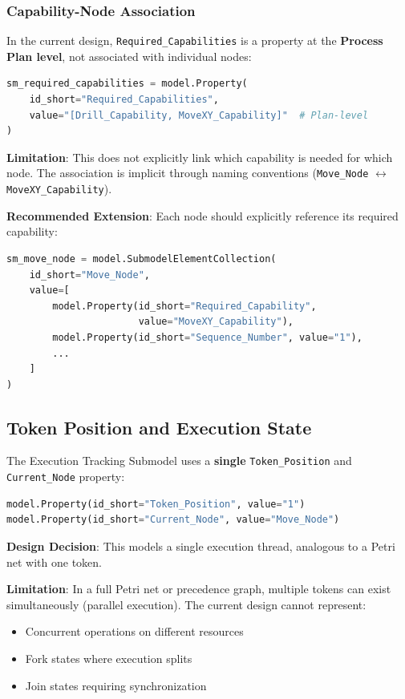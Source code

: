 \subsubsection{Capability-Node Association}

In the current design, \texttt{Required\_Capabilities} is a property at the \textbf{Process Plan level}, not associated with individual nodes:

\begin{lstlisting}[language=Python]
sm_required_capabilities = model.Property(
    id_short="Required_Capabilities",
    value="[Drill_Capability, MoveXY_Capability]"  # Plan-level
)
\end{lstlisting}

\textbf{Limitation}: This does not explicitly link which capability is needed for which node. The association is implicit through naming conventions (\texttt{Move\_Node} $\leftrightarrow$ \texttt{MoveXY\_Capability}).

\textbf{Recommended Extension}: Each node should explicitly reference its required capability:

\begin{lstlisting}[language=Python]
sm_move_node = model.SubmodelElementCollection(
    id_short="Move_Node",
    value=[
        model.Property(id_short="Required_Capability", 
                       value="MoveXY_Capability"),
        model.Property(id_short="Sequence_Number", value="1"),
        ...
    ]
)
\end{lstlisting}
\subsection{Token Position and Execution State}
\label{subsec:token_position}

The Execution Tracking Submodel uses a \textbf{single} \texttt{Token\_Position} and \texttt{Current\_Node} property:

\begin{lstlisting}[language=Python]
model.Property(id_short="Token_Position", value="1")
model.Property(id_short="Current_Node", value="Move_Node")
\end{lstlisting}

\textbf{Design Decision}: This models a single execution thread, analogous to a Petri net with one token.

\textbf{Limitation}: In a full Petri net or precedence graph, multiple tokens can exist simultaneously (parallel execution). The current design cannot represent:
\begin{itemize}
    \item Concurrent operations on different resources
    \item Fork states where execution splits
    \item Join states requiring synchronization
\end{itemize}

